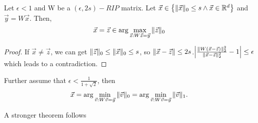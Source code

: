 \begin{theorem}
    Let $ \epsilon < 1 $ and W be a $ (\epsilon, 2s)-RIP $ matrix. Let $ \vec{x} \in \left\{ \Arrowvert \vec{x} \Arrowvert_0 \le s \wedge \vec{x} \in \mathbb{R}^{d} \right\} $ and $ \vec{y} = W \vec{x} $. Then,
    \[
        \vec{x} = \vec{z} \in \arg\max_{\vec{z}: W \vec{z} = \vec{y}} \Arrowvert \vec{z} \Arrowvert_0
    \]
    \begin{proof}
        If $ \vec{x} \ne \vec{z} $, we can get $ \Arrowvert \vec{z} \Arrowvert_0 \le \Arrowvert \vec{x} \Arrowvert_0 \le s $, so $ \Arrowvert \vec{x} - \vec{z} \Arrowvert \le 2s $.$ \left| \frac{ \Arrowvert W (\vec{x} - \vec{z}) \Arrowvert^2_2}{ \Arrowvert \vec{x} - \vec{z} \Arrowvert^2_2} -1 \right| \le \epsilon $ which leads to a contradiction.
    \end{proof}
\end{theorem}

\begin{theorem}
    Further assume that $ \epsilon < \frac{1}{1 + \sqrt 2} $, then
    \[
        \vec{x} = \arg\min_{\vec{v}: W \vec{v} = \vec{y}} \Arrowvert \vec{v} \Arrowvert_0 = \arg\min_{\vec{v}: W \vec{v} = \vec{y}} \Arrowvert \vec{v} \Arrowvert_1.
    \]
\end{theorem}

A stronger theorem follows

